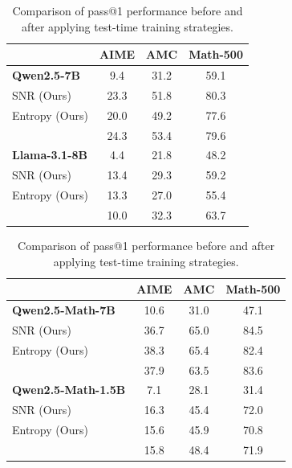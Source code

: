 \begin{table}[t!]
\caption{Comparison of pass@1 performance before and after applying test-time training strategies.}
\vspace{-5pt}
\label{tab:test-time-training-results}
\begin{center}
\footnotesize
\begin{minipage}{0.47\linewidth}
\centering
\begin{tabular}{lccc}
\toprule
 & \textbf{AIME} & \textbf{AMC} & \textbf{Math\scriptsize-500\footnotesize} \\
\midrule
\textbf{Qwen2.5-7B} & 9.4 & 31.2 &  59.1 \\
SNR (Ours)& 23.3 &  51.8& 80.3 \\
Entropy (Ours)& 20.0 & 49.2 & 77.6 \\
\citet{zuo2025ttrl} & 24.3 & 53.4 & 79.6  \\
\midrule
\textbf{Llama-3.1-8B} & 4.4 & 21.8 & 48.2  \\
SNR (Ours)& 13.4 & 29.3 & 59.2 \\
Entropy (Ours)& 13.3 & 27.0  &  55.4 \\
\citet{zuo2025ttrl} & 10.0 & 32.3 & 63.7 \\
\bottomrule
\end{tabular}
\end{minipage}
\hfill
\begin{minipage}{0.47\linewidth}
\footnotesize
\centering
\begin{tabular}{lccc}
\toprule
 & \textbf{AIME} & \textbf{AMC} & \textbf{Math\scriptsize-500\footnotesize} \\
\midrule
\textbf{Qwen2.5-Math-7B} & 10.6 & 31.0 & 47.1\\
SNR (Ours) & 36.7 & 65.0 & 84.5 \\
Entropy (Ours) & 38.3 &  65.4 & 82.4 \\
\citet{zuo2025ttrl} & 37.9 & 63.5 &  83.6\\
\midrule
\textbf{Qwen2.5-Math-1.5B} & 7.1 & 28.1 & 31.4 \\
SNR (Ours)& 16.3  & 45.4 & 72.0 \\
Entropy (Ours)& 15.6  & 45.9 & 70.8 \\
\citet{zuo2025ttrl} & 15.8 & 48.4 & 71.9 \\
\bottomrule
\end{tabular}
\end{minipage}
\end{center}
\vspace{-10pt}
\end{table}
\normalsize




